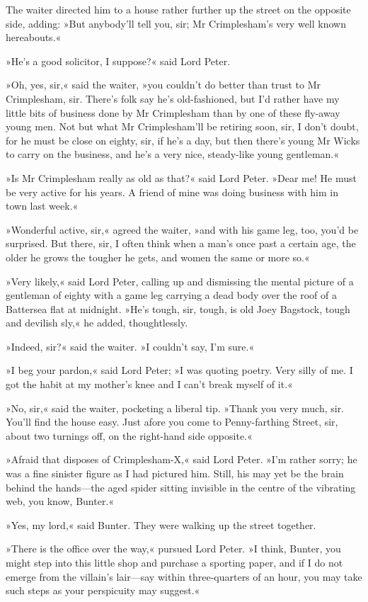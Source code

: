 The waiter directed him to a house rather further up the street on the opposite side, adding: »But anybody'll tell you, sir; Mr Crimplesham's very well known hereabouts.«

»He's a good solicitor, I suppose?« said Lord Peter.

»Oh, yes, sir,« said the waiter, »you couldn't do better than trust to Mr Crimplesham, sir. There's folk say he's old-fashioned, but I'd rather have my little bits of business done by Mr Crimplesham than by one of these fly-away young men. Not but what Mr Crimplesham'll be retiring soon, sir, I don't doubt, for he must be close on eighty, sir, if he's a day, but then there's young Mr Wicks to carry on the business, and he's a very nice, steady-like young gentleman.«

»Is Mr Crimplesham really as old as that?« said Lord Peter. »Dear me! He must be very active for his years. A friend of mine was doing business with him in town last week.«

»Wonderful active, sir,« agreed the waiter, »and with his game leg, too, you'd be surprised. But there, sir, I often think when a man's once past a certain age, the older he grows the tougher he gets, and women the same or more so.«

»Very likely,« said Lord Peter, calling up and dismissing the mental picture of a gentleman of eighty with a game leg carrying a dead body over the roof of a Battersea flat at midnight. »He's tough, sir, tough, is old Joey Bagstock, tough and devilish sly,« he added, thoughtlessly.

»Indeed, sir?« said the waiter. »I couldn't say, I'm sure.«

»I beg your pardon,« said Lord Peter; »I was quoting poetry. Very silly of me. I got the habit at my mother's knee and I can't break myself of it.«

»No, sir,« said the waiter, pocketing a liberal tip. »Thank you very much, sir. You'll find the house easy. Just afore you come to Penny-farthing Street, sir, about two turnings off, on the right-hand side opposite.«

»Afraid that disposes of Crimplesham-X,« said Lord Peter. »I'm rather sorry; he was a fine sinister figure as I had pictured him. Still, his may yet be the brain behind the hands—the aged spider sitting invisible in the centre of the vibrating web, you know, Bunter.«

»Yes, my lord,« said Bunter. They were walking up the street together.

»There is the office over the way,« pursued Lord Peter. »I think, Bunter, you might step into this little shop and purchase a sporting paper, and if I do not emerge from the villain's lair—say within three-quarters of an hour, you may take such steps as your perspicuity may suggest.«

